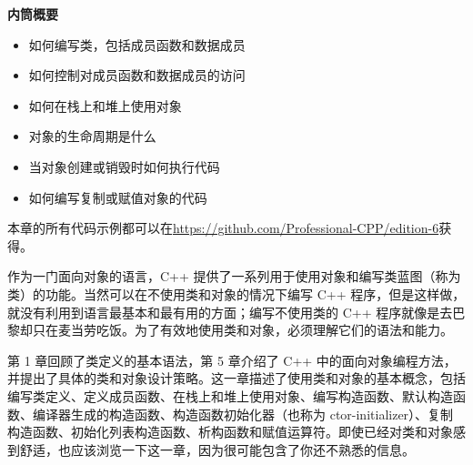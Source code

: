 \noindent
\textbf{内筒概要}

\begin{itemize}
\item
如何编写类，包括成员函数和数据成员

\item
如何控制对成员函数和数据成员的访问

\item
如何在栈上和堆上使用对象

\item
对象的生命周期是什么

\item
当对象创建或销毁时如何执行代码

\item
如何编写复制或赋值对象的代码
\end{itemize}

本章的所有代码示例都可以在\url{https://github.com/Professional-CPP/edition-6}获得。

作为一门面向对象的语言，C++ 提供了一系列用于使用对象和编写类蓝图（称为类）的功能。当然可以在不使用类和对象的情况下编写 C++ 程序，但是这样做，就没有利用到语言最基本和最有用的方面；编写不使用类的 C++ 程序就像是去巴黎却只在麦当劳吃饭。为了有效地使用类和对象，必须理解它们的语法和能力。

第 1 章回顾了类定义的基本语法，第 5 章介绍了 C++ 中的面向对象编程方法，并提出了具体的类和对象设计策略。这一章描述了使用类和对象的基本概念，包括编写类定义、定义成员函数、在栈上和堆上使用对象、编写构造函数、默认构造函数、编译器生成的构造函数、构造函数初始化器（也称为 ctor-initializer）、复制构造函数、初始化列表构造函数、析构函数和赋值运算符。即使已经对类和对象感到舒适，也应该浏览一下这一章，因为很可能包含了你还不熟悉的信息。
























